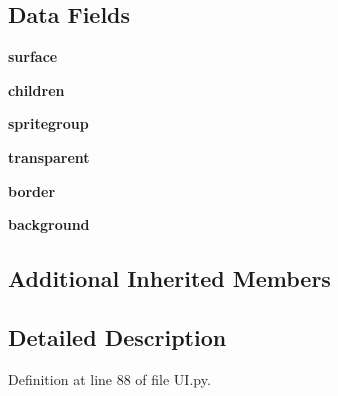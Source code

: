 \subsection*{Data Fields}
\begin{DoxyCompactItemize}
\item 
\hypertarget{classUI_1_1UIContainer_aab097a0ee7364c3c58163cf202404cb5}{{\bfseries surface}}\label{classUI_1_1UIContainer_aab097a0ee7364c3c58163cf202404cb5}

\item 
\hypertarget{classUI_1_1UIContainer_a0dc071f9b77e2a257e677d55268a3870}{{\bfseries children}}\label{classUI_1_1UIContainer_a0dc071f9b77e2a257e677d55268a3870}

\item 
\hypertarget{classUI_1_1UIContainer_ae30ea77c909ee3ee6e73677776785a55}{{\bfseries spritegroup}}\label{classUI_1_1UIContainer_ae30ea77c909ee3ee6e73677776785a55}

\item 
\hypertarget{classUI_1_1UIContainer_a428c98f65054df5f9f2b1d32bfb30769}{{\bfseries transparent}}\label{classUI_1_1UIContainer_a428c98f65054df5f9f2b1d32bfb30769}

\item 
\hypertarget{classUI_1_1UIContainer_a0b4042a5ad01846991d8d2ce84ac1bea}{{\bfseries border}}\label{classUI_1_1UIContainer_a0b4042a5ad01846991d8d2ce84ac1bea}

\item 
\hypertarget{classUI_1_1UIContainer_a6b592af1458ef0a70bf47129956300a0}{{\bfseries background}}\label{classUI_1_1UIContainer_a6b592af1458ef0a70bf47129956300a0}

\end{DoxyCompactItemize}
\subsection*{Additional Inherited Members}


\subsection{Detailed Description}


Definition at line 88 of file U\-I.\-py.



